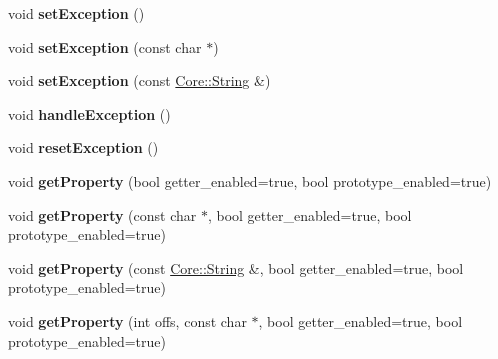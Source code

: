 \begin{DoxyCompactItemize}
\item 
void {\bfseries set\+Exception} ()\hypertarget{class_object_script_1_1_o_s_ad33825bd55a327cbbc2d75946ac9f02c}{}\label{class_object_script_1_1_o_s_ad33825bd55a327cbbc2d75946ac9f02c}

\item 
void {\bfseries set\+Exception} (const char $\ast$)\hypertarget{class_object_script_1_1_o_s_ae9dac6e98aea30c57f7a45eebf6489d8}{}\label{class_object_script_1_1_o_s_ae9dac6e98aea30c57f7a45eebf6489d8}

\item 
void {\bfseries set\+Exception} (const \hyperlink{class_object_script_1_1_o_s_1_1_core_1_1_string}{Core\+::\+String} \&)\hypertarget{class_object_script_1_1_o_s_af61e66dedddae6fcbb2ce19181f28806}{}\label{class_object_script_1_1_o_s_af61e66dedddae6fcbb2ce19181f28806}

\item 
void {\bfseries handle\+Exception} ()\hypertarget{class_object_script_1_1_o_s_a51fc876063f1add09575c65dea23dc29}{}\label{class_object_script_1_1_o_s_a51fc876063f1add09575c65dea23dc29}

\item 
void {\bfseries reset\+Exception} ()\hypertarget{class_object_script_1_1_o_s_ad622514e3eb728d1d10455ede9b867e7}{}\label{class_object_script_1_1_o_s_ad622514e3eb728d1d10455ede9b867e7}

\item 
void {\bfseries get\+Property} (bool getter\+\_\+enabled=true, bool prototype\+\_\+enabled=true)\hypertarget{class_object_script_1_1_o_s_a3fd600dc121980822e70feb5fd1aedf9}{}\label{class_object_script_1_1_o_s_a3fd600dc121980822e70feb5fd1aedf9}

\item 
void {\bfseries get\+Property} (const char $\ast$, bool getter\+\_\+enabled=true, bool prototype\+\_\+enabled=true)\hypertarget{class_object_script_1_1_o_s_a2dc1f141a957cf944cbb426466da8ebc}{}\label{class_object_script_1_1_o_s_a2dc1f141a957cf944cbb426466da8ebc}

\item 
void {\bfseries get\+Property} (const \hyperlink{class_object_script_1_1_o_s_1_1_core_1_1_string}{Core\+::\+String} \&, bool getter\+\_\+enabled=true, bool prototype\+\_\+enabled=true)\hypertarget{class_object_script_1_1_o_s_aaa0ac6e48fd42f9606990f1c7d73d5b5}{}\label{class_object_script_1_1_o_s_aaa0ac6e48fd42f9606990f1c7d73d5b5}

\item 
void {\bfseries get\+Property} (int offs, const char $\ast$, bool getter\+\_\+enabled=true, bool prototype\+\_\+enabled=true)\hypertarget{class_object_script_1_1_o_s_a0daaa63b9a29602ca1bbd781def0819d}{}\label{class_object_script_1_1_o_s_a0daaa63b9a29602ca1bbd781def0819d}


\end{DoxyCompactItemize}
